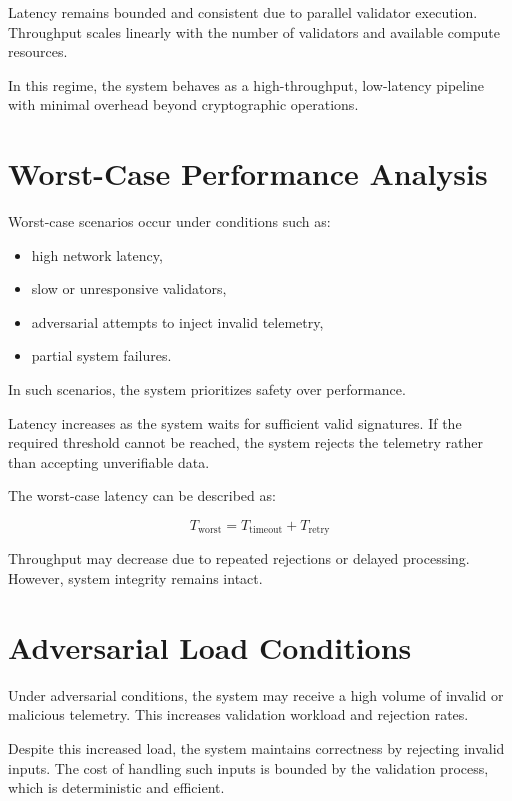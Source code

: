 Latency remains bounded and consistent due to parallel validator execution. Throughput scales linearly with the number of validators and available compute resources.

In this regime, the system behaves as a high-throughput, low-latency pipeline with minimal overhead beyond cryptographic operations.

\section{Worst-Case Performance Analysis}

Worst-case scenarios occur under conditions such as:

\begin{itemize}
\item high network latency,
\item slow or unresponsive validators,
\item adversarial attempts to inject invalid telemetry,
\item partial system failures.
\end{itemize}

In such scenarios, the system prioritizes safety over performance.

Latency increases as the system waits for sufficient valid signatures. If the required threshold cannot be reached, the system rejects the telemetry rather than accepting unverifiable data.

The worst-case latency can be described as:

\begin{equation}
T_{\text{worst}} = T_{\text{timeout}} + T_{\text{retry}}
\end{equation}

Throughput may decrease due to repeated rejections or delayed processing. However, system integrity remains intact.

\section{Adversarial Load Conditions}

Under adversarial conditions, the system may receive a high volume of invalid or malicious telemetry. This increases validation workload and rejection rates.

Despite this increased load, the system maintains correctness by rejecting invalid inputs. The cost of handling such inputs is bounded by the validation process, which is deterministic and efficient.

